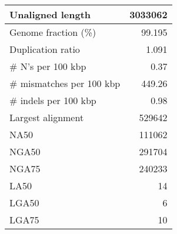 \documentclass[12pt,a4paper]{article}
\begin{document}
\begin{table}[ht]
\begin{center}
\begin{tabular}{|l*{1}{|r}|}
Unaligned length & 3033062 \\ \hline
Genome fraction (\%) & 99.195 \\ \hline
Duplication ratio & 1.091 \\ \hline
\# N's per 100 kbp & 0.37 \\ \hline
\# mismatches per 100 kbp & 449.26 \\ \hline
\# indels per 100 kbp & 0.98 \\ \hline
Largest alignment & 529642 \\ \hline
NA50 & 111062 \\ \hline
NGA50 & 291704 \\ \hline
NGA75 & 240233 \\ \hline
LA50 & 14 \\ \hline
LGA50 & 6 \\ \hline
LGA75 & 10 \\ \hline
\end{tabular}
\end{center}
\end{table}
\end{document}
